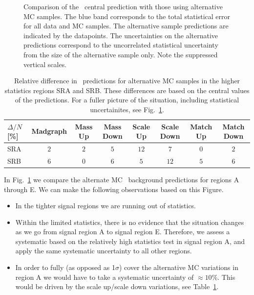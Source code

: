 \begin{figure}[hbt]
\begin{center}
	\caption{
	  \label{fig:ttllsyst}\protect 
          Comparison of the \ttll\ central prediction with those using
          alternative MC samples. The blue band corresponds to the
          total statistical error for all data and MC samples. The
          alternative sample predictions are indicated by the
          datapoints. The uncertainties on the alternative predictions
          correspond to the uncorrelated statistical uncertainty from
          the size of the alternative sample only.  Note the
          suppressed vertical scales.}
      \end{center}
    \end{figure}


\begin{table}[!h]
\begin{center}
{\footnotesize
\begin{tabular}{l||c|c|c|c|c|c|c}
\hline
$\Delta/N$  [\%] & Madgraph & Mass Up & Mass Down & Scale Up & Scale Down &
Match Up & Match Down \\
\hline
\hline
SRA 	 & $2$ & $2$ & $5$ & $12$ & $7$ & $0$ & $2$  \\
\hline
SRB 	 & $6$ & $0$ & $6$ & $5$ & $12$ & $5$ & $6$  \\
\hline
\hline
\end{tabular}}
\caption{ Relative difference in \ttdl\ predictions for alternative MC
  samples in
the higher statistics regions SRA and SRB.  These differences 
are based on the central values of the predictions.  For a fuller
picture
of the situation, including statistical uncertainites, see Fig.~\ref{fig:ttllsyst}. 
\label{tab:fracdiff}}
\end{center}
\end{table}


In Fig.~\ref{fig:ttllsyst} we compare the alternate MC \ttll\ background predictions 
for regions A through E.  We can make the following observations based
on this Figure.

\begin{itemize}
\item In the tighter signal regions we are running out of
  statistics.    
\item Within the limited statistics, there is no evidence that the
  situation changes as we go from signal region A to signal region E.
Therefore, we assess a systematic based on the relatively high
statistics
test in signal region A, and apply the same systematic uncertainty
to all other regions.
\item In order to fully (as opposed as 1$\sigma$) cover the 
alternative MC variations in region A we would have to take a
systematic
uncertainty of $\approx 10\%$.  This would be driven by the 
scale up/scale down variations, see Table~\ref{tab:fracdiff}.
\end{itemize}

